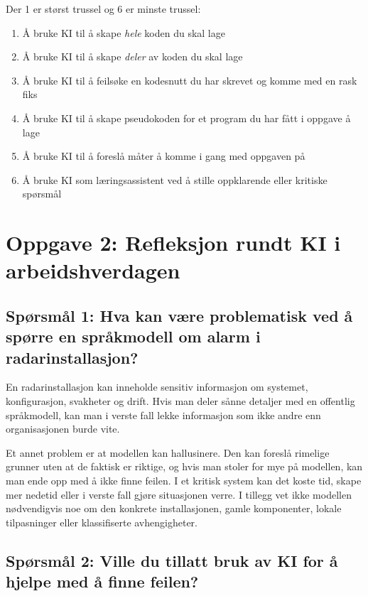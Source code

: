 \documentclass[12pt,a4paper]{article}
\begin{document}
Der 1 er størst trussel og 6 er minste trussel:

\begin{enumerate}
    \item Å bruke KI til å skape \textit{hele} koden du skal lage
    \item Å bruke KI til å skape \textit{deler} av koden du skal lage
    \item Å bruke KI til å feilsøke en kodesnutt du har skrevet og komme med en rask fiks
    \item Å bruke KI til å skape pseudokoden for et program du har fått i oppgave å lage
    \item Å bruke KI til å foreslå måter å komme i gang med oppgaven på
    \item Å bruke KI som læringsassistent ved å stille oppklarende eller kritiske spørsmål
\end{enumerate}

\section{Oppgave 2: Refleksjon rundt KI i arbeidshverdagen}

\subsection*{Spørsmål 1: Hva kan være problematisk ved å spørre en språkmodell om alarm i radarinstallasjon?}

En radarinstallasjon kan inneholde sensitiv informasjon om systemet, konfigurasjon, svakheter
og drift. Hvis man deler sånne detaljer med en offentlig språkmodell, kan man i verste fall
lekke informasjon som ikke andre enn organisasjonen burde vite.

Et annet problem er at modellen kan hallusinere. Den kan foreslå rimelige grunner uten at de
faktisk er riktige, og hvis man stoler for mye på modellen, kan man ende opp med å ikke finne
feilen. I et kritisk system kan det koste tid, skape mer nedetid eller i verste fall gjøre
situasjonen verre. I tillegg vet ikke modellen nødvendigvis noe om den konkrete
installasjonen, gamle komponenter, lokale tilpasninger eller klassifiserte avhengigheter.

\subsection*{Spørsmål 2: Ville du tillatt bruk av KI for å hjelpe med å finne feilen?}
\end{document}
